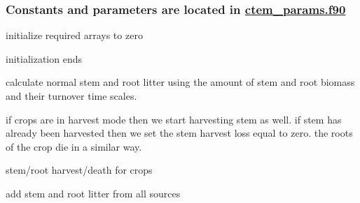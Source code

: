  \subsubsection*{Constants and parameters are located in \hyperlink{ctem__params_8f90}{ctem\+\_\+params.\+f90} }

initialize required arrays to zero

initialization ends 



calculate normal stem and root litter using the amount of stem and root biomass and their turnover time scales.

if crops are in harvest mode then we start harvesting stem as well. if stem has already been harvested then we set the stem harvest loss equal to zero. the roots of the crop die in a similar way.

stem/root harvest/death for crops

add stem and root litter from all sources
